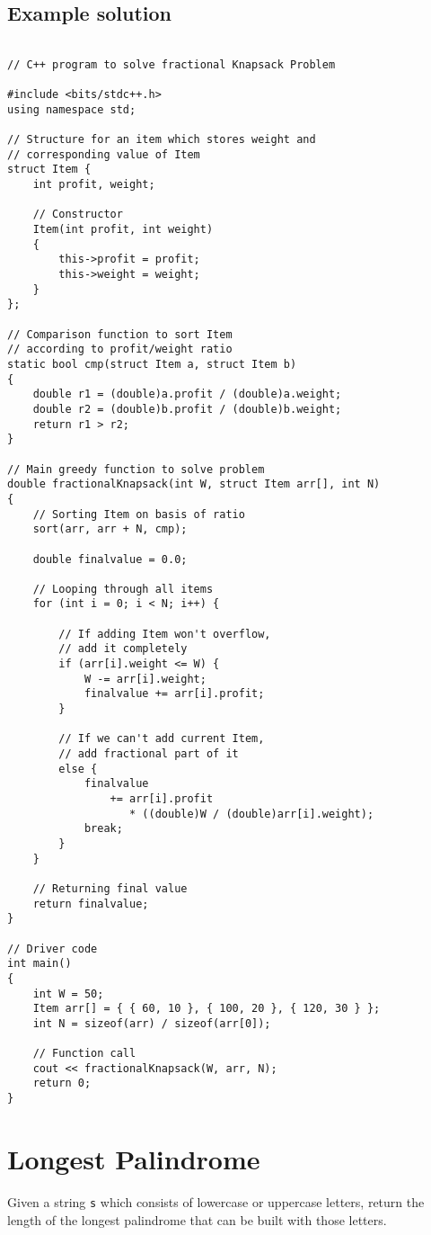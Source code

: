 \documentclass[11pt]{article}
\begin{document}
\subsection{Example solution}
\label{sec:orgb18d731}
\begin{verbatim}

// C++ program to solve fractional Knapsack Problem

#include <bits/stdc++.h>
using namespace std;

// Structure for an item which stores weight and
// corresponding value of Item
struct Item {
    int profit, weight;

    // Constructor
    Item(int profit, int weight)
    {
        this->profit = profit;
        this->weight = weight;
    }
};

// Comparison function to sort Item
// according to profit/weight ratio
static bool cmp(struct Item a, struct Item b)
{
    double r1 = (double)a.profit / (double)a.weight;
    double r2 = (double)b.profit / (double)b.weight;
    return r1 > r2;
}

// Main greedy function to solve problem
double fractionalKnapsack(int W, struct Item arr[], int N)
{
    // Sorting Item on basis of ratio
    sort(arr, arr + N, cmp);

    double finalvalue = 0.0;

    // Looping through all items
    for (int i = 0; i < N; i++) {

        // If adding Item won't overflow,
        // add it completely
        if (arr[i].weight <= W) {
            W -= arr[i].weight;
            finalvalue += arr[i].profit;
        }

        // If we can't add current Item,
        // add fractional part of it
        else {
            finalvalue
                += arr[i].profit
                   * ((double)W / (double)arr[i].weight);
            break;
        }
    }

    // Returning final value
    return finalvalue;
}

// Driver code
int main()
{
    int W = 50;
    Item arr[] = { { 60, 10 }, { 100, 20 }, { 120, 30 } };
    int N = sizeof(arr) / sizeof(arr[0]);

    // Function call
    cout << fractionalKnapsack(W, arr, N);
    return 0;
}
\end{verbatim}

\section{Longest Palindrome}
\label{sec:org1a668d3}
Given a string \texttt{s} which consists of lowercase or uppercase letters, return the length of the longest palindrome that can be built with those letters.
\end{document}
